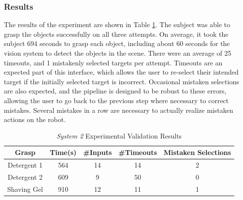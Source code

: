 \subsubsection{Results}
The results of the experiment are shown in Table \ref{tab:semg_table_1}. The subject was able to grasp the objects successfully on all three attempts. On average, it took the subject 694 seconds to grasp each object, including about 60 seconds for the vision system to detect the objects in the scene. There were an average of 25 timeouts, and 1 mistakenly selected targets per attempt. Timeouts are an expected part of this interface, which allows the user to re-select their intended target if the initially selected target is incorrect. Occasional mistaken selections are also expected, and the pipeline is designed to be robust to these errors, allowing the user to go back to the previous step where necessary to correct mistakes. Several mistakes in a row are necessary to actually realize mistaken actions on the robot.


\begin{table}[ht!]
\centering
\begin{tabular}{|c|c|c|c|c|}
\hline
Grasp & Time(s) & \#Inputs & \#Timeouts & \begin{minipage}{.6in}\centering Mistaken Selections\end{minipage} \\ \hline
Detergent 1 & 564 & 14 & 14 & 2\\ \hline
Detergent 2 & 609 & 9 & 50 & 0\\ \hline
Shaving Gel & 910 & 12 & 11 & 1\\ \hline
\end{tabular}
\caption{\emph{System 2} Experimental Validation Results}
\label{tab:semg_table_1}
\end{table}

